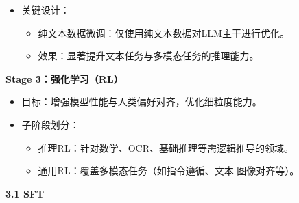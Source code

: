 \documentclass[zihao=false,fontset=windows]{ctexart}
\begin{document}
\begin{itemize}[label=\textcolor{feishuBlue}{\textbullet}]
\item 关键设计：
\begin{itemize}[label=\textcolor{feishuBlue}{\textbullet}]
\item 纯文本数据微调：仅使用\textcolor{feishuRed}{纯文本数据}对LLM主干进行优化。

\end{itemize}

\begin{itemize}[label=\textcolor{feishuBlue}{\textbullet}]
\item 效果：显著提升文本任务与多模态任务的推理能力。

\end{itemize}

\end{itemize}

\textbf{Stage 3：强化学习（RL）}\par

\begin{itemize}[label=\textcolor{feishuBlue}{\textbullet}]
\item 目标：增强模型性能与人类偏好对齐，优化细粒度能力。

\end{itemize}

\begin{itemize}[label=\textcolor{feishuBlue}{\textbullet}]
\item 子阶段划分：
\begin{itemize}[label=\textcolor{feishuBlue}{\textbullet}]
\item 推理RL：针对数学、OCR、基础推理等需逻辑推导的领域。

\end{itemize}

\begin{itemize}[label=\textcolor{feishuBlue}{\textbullet}]
\item 通用RL：覆盖多模态任务（如指令遵循、文本-图像对齐等）。

\end{itemize}

\end{itemize}

\Needspace{2cm}\par\vspace{0.9em}\begin{tcolorbox}[enhanced,colback=headOrange,boxrule=0pt,arc=4pt,boxsep=0pt,left=3pt,right=3pt,top=2pt,bottom=2pt,before skip=0pt,after skip=3pt]\bfseries \textcolor{feishuBlue}{3.1} SFT\end{tcolorbox}
\end{document}
